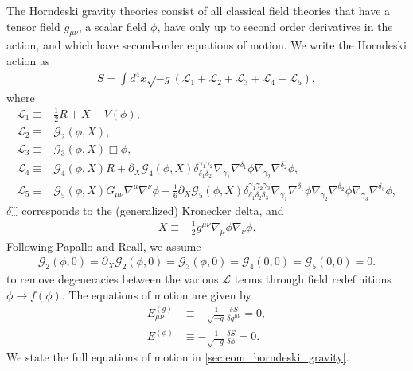 \documentclass{ws-ijmpd}
\begin{document}
The Horndeski gravity theories consist of all classical field theories
that have a tensor field $g_{\mu\nu}$, a scalar field $\phi$, 
have only up to second order derivatives in the action,
and which have second-order equations of 
motion\cite{horndeski_paper,Deffayet:2009wt,Deffayet:2011gz}.
We write the Horndeski action as
\begin{align}
\label{eq:general_horndeski_action}
   S
   =
   \int d^4x\sqrt{-g}
   \left(
      \mathcal{L}_1
      +
      \mathcal{L}_2
      +
      \mathcal{L}_3
      +
      \mathcal{L}_4
      +
      \mathcal{L}_5
   \right)
   ,
\end{align}
where
\begin{align}
   \mathcal{L}_1
   \equiv&
   \frac{1}{2}R
   +
   X
   -
   V\left(\phi\right)
   ,\\
   \mathcal{L}_2
   \equiv&
   \mathcal{G}_2\left(\phi,X\right)
   ,\\
   \mathcal{L}_3
   \equiv&
   \mathcal{G}_3\left(\phi,X\right)\Box\phi
   ,\\
   \mathcal{L}_4
   \equiv&
   \mathcal{G}_4\left(\phi,X\right)R
   +
   \partial_X\mathcal{G}_4\left(\phi,X\right)
   \delta^{\gamma_1\gamma_2}_{\delta_1\delta_2}
   \nabla_{\gamma_1}\nabla^{\delta_1}\phi
   \nabla_{\gamma_2}\nabla^{\delta_2}\phi
   ,\\
   \mathcal{L}_5
   \equiv&
   \mathcal{G}_5\left(\phi,X\right)G_{\mu\nu}\nabla^{\mu}\nabla^{\nu}\phi
   -
   \frac{1}{6}\partial_X\mathcal{G}_5\left(\phi,X\right)
   \delta^{\gamma_1\gamma_2\gamma_3}_{\delta_1\delta_2\delta_3}
   \nabla_{\gamma_1}\nabla^{\delta_1}\phi
   \nabla_{\gamma_2}\nabla^{\delta_2}\phi
   \nabla_{\gamma_3}\nabla^{\delta_3}\phi
   ,
\end{align}
$\delta^{\cdots}_{\cdots}$ corresponds to the (generalized) Kronecker delta,
and
\begin{align}
   X
   \equiv
   -
   \frac{1}{2}g^{\mu\nu}\nabla_{\mu}\phi\nabla_{\nu}\phi
   .
\end{align}
Following Papallo and Reall\cite{Papallo:2017qvl}, we assume
\begin{align}
   \label{eq:coefficient_assumptions}
   \mathcal{G}_2\left(\phi,0\right)
   =
   \partial_X\mathcal{G}_2\left(\phi,0\right)
   =
   \mathcal{G}_3\left(\phi,0\right)
   =
   \mathcal{G}_4\left(0,0\right)
   =
   \mathcal{G}_5\left(0,0\right)
   =
   0
   .
\end{align}
to remove degeneracies between the various $\mathcal{L}$ terms
through field redefinitions $\phi\to f(\phi)$.
The equations of motion are given by
\begin{align}
   E^{(g)}_{\mu\nu}
   &\equiv
   -
   \frac{1}{\sqrt{-g}}\frac{\delta S}{\delta g^{\mu\nu}}
   =
   0
   ,\\
   E^{(\phi)}
   &\equiv
   -
   \frac{1}{\sqrt{-g}}\frac{\delta S}{\delta\phi} 
   =
   0
   .
\end{align}
We state the full equations of motion in \ref{sec:eom_horndeski_gravity}.
\end{document}
